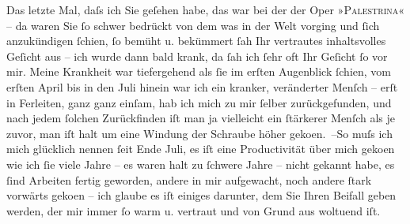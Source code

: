 \pstart
           Das letzte Mal, daſs ich Sie geſehen habe, das war bei der \label{K_L02326-1v}\label{K_L02326-1} der Oper »\textsc{Palestrina}« – da waren Sie ſo schwer bedrückt von dem was in der Welt vorging und ſich
               anzukündigen ſchien, ſo bemüht u. bekümmert ſah Ihr vertrautes inhaltsvolles Geſicht
               aus – ich wurde dann bald krank, da ſah ich ſehr oft Ihr Geſicht ſo vor mir. Meine
               Krankheit war tiefergehend als ſie im erſten Augenblick ſchien, vom erſten
                  April bis in den Juli hinein war ich ein kranker, veränderter
               Menſch – erſt in Ferleiten, ganz ganz einſam,
               hab ich mich zu mir ſelber {\pb}zurückgefunden, und nach jedem ſolchen Zurückfinden iſt man ja vielleicht ein
               ſtärkerer Menſch als je zuvor, man iſt halt um eine Windung der Schraube höher geko{\geminationm}en. –\hspace*{1.5em}So muſs ich mich
               glücklich nennen ſeit Ende Juli, es iſt eine Productivität über mich
                  geko{\geminationm}en wie ich ſie viele Jahre – es waren halt zu
               ſchwere Jahre – nicht gekannt habe, es ſind Arbeiten fertig geworden, andere in mir
               aufgewacht, noch andere ſtark vorwärts geko{\geminationm}en – ich
               glaube es iſt einiges darunter, dem Sie Ihren Beifall geben werden, der mir immer ſo
               warm u. vertraut und von Grund aus woltuend iſt.\pend
           
